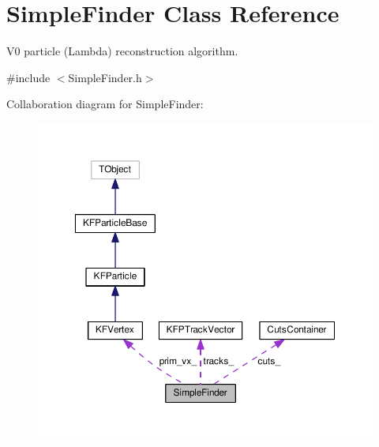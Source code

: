 \hypertarget{classSimpleFinder}{}\section{Simple\+Finder Class Reference}
\label{classSimpleFinder}


V0 particle (Lambda) reconstruction algorithm.  




{\ttfamily \#include $<$Simple\+Finder.\+h$>$}



Collaboration diagram for Simple\+Finder\+:\nopagebreak
\begin{figure}[H]
\begin{center}
\leavevmode
\includegraphics[width=350pt]{classSimpleFinder__coll__graph}
\end{center}
\end{figure}
